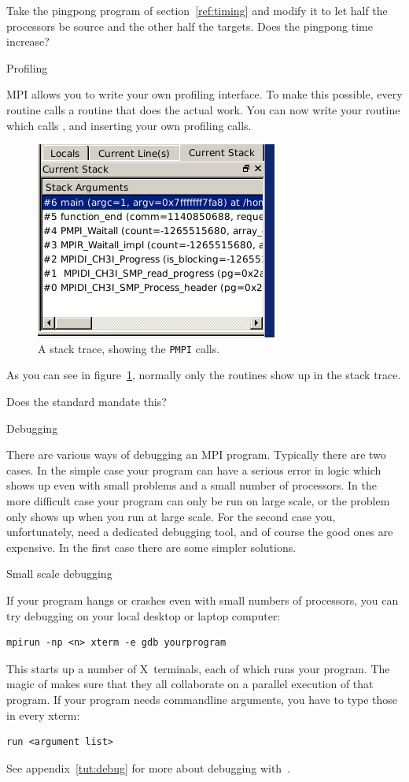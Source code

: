 \begin{exercise}
  Take the pingpong program of section~\ref{ref:timing} and modify it 
  to let half the processors
  be source and the other half the targets. Does the pingpong time increase?
\end{exercise}

 {Profiling}

MPI allows you to write your own profiling interface. To make this possible,
every routine  calls a routine  that 
does the actual work. You can now write your  routine
which calls , and inserting your own profiling calls.
\begin{figure}
  \includegraphics[scale=.7]{graphics/pmpi}
  \caption{A stack trace, showing the \texttt{PMPI} calls.}
  \label{fig:pmpi}
\end{figure}
As you can see in figure~\ref{fig:pmpi}, normally only the  routines
show up in the stack trace.

Does the standard mandate this?

 {Debugging}
\label{sec:debug}

There are various ways of debugging an MPI program. Typically there
are two cases. In the simple case your program can have a serious
error in logic which shows up even with small problems and a small
number of processors. In the more difficult case your program can only
be run on large scale, or the problem only shows up when you run at
large scale. For the second case you, unfortunately, need a dedicated
debugging tool, and of course the good ones are expensive. In the
first case there are some simpler solutions.

 {Small scale debugging}

If your program hangs or crashes even with small numbers of
processors, you can try debugging on your local desktop or laptop
computer:
\begin{verbatim}
mpirun -np <n> xterm -e gdb yourprogram
\end{verbatim}
This starts up a number of X~terminals, each of which runs your
program. The magic of  makes sure that they all collaborate
on a parallel execution of that program. If your program needs
commandline arguments, you have to type those in every xterm:
\begin{verbatim}
run <argument list>
\end{verbatim}
See appendix~\ref{tut:debug} for more about debugging with~.

